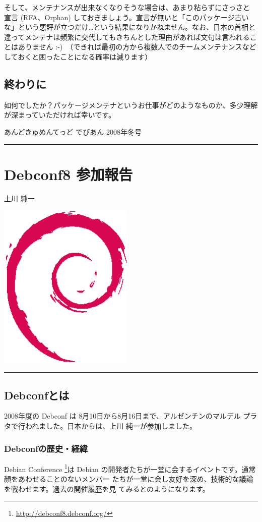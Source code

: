 \documentclass[mingoth,a4paper]{jsarticle}
\renewcommand{\dancersection}[2]{%
\newpage
あんどきゅめんてっど でびあん 2008年冬号
%
\vspace{0.1mm}\\
{\color{dancerlightblue}\rule{\hsize}{2mm}}

%
%
\begin{minipage}[t]{0.6\hsize}
\color{dancerdarkblue}
\vspace{1cm}
\section{#1}
\hfill{}#2\\
\end{minipage}
\begin{minipage}[t]{0.4\hsize}
\vspace{-2cm}
\hfill{}\includegraphics[height=8cm]{image200502/openlogo-nd.eps}\\
\vspace{-5cm}
\end{minipage}
%
%
{\color{dancerdarkblue}\rule{0.74\hsize}{2mm}}
%
\vspace{2cm}
}
\begin{document}
そして、メンテナンスが出来なくなりそうな場合は、あまり粘らずにさっさと
宣言 (RFA、Orphan) しておきましょう。宣言が無いと「このパッケージ古いな」という悪評が立つだけ…という結果になりかねません。なお、日本の首相と違ってメンテナは頻繁に交代してもきちんとした理由があれば文句は言われることはありません :-)　（できれば最初の方から複数人でのチームメンテナンスなどしておくと困ったことになる確率は減ります）


\subsection{終わりに}
如何でしたか？パッケージメンテナというお仕事がどのようなものか、多少理解が深まっていただければ幸いです。




\dancersection{Debconf8 参加報告}{上川 純一}
\label{sec:debconf8uekawa}

\subsection{Debconfとは}

2008年度の Debconf は 8月10日から8月16日まで、アルゼンチンのマルデル
プラタで行われました。日本からは、上川 純一が参加しました。

\subsubsection{Debconfの歴史・経緯}

Debian Conference \footnote{\url{http://debconf8.debconf.org/}}は Debian 
の開発者たちが一堂に会するイベントです。通常顔をあわせることのないメンバー
たちが一堂に会し友好を深め、技術的な議論を戦わせます。過去の開催履歴を見
てみるとのようになります。
\end{document}
